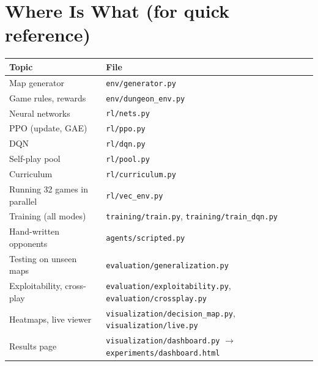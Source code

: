 \documentclass[11pt,a4paper]{article}
\newcommand{\code}[1]{\texttt{#1}}
\begin{document}
\section*{Where Is What (for quick reference)}
\begin{center}
\begin{tabular}{ll}
\toprule
\textbf{Topic} & \textbf{File}\\
\midrule
Map generator & \code{env/generator.py}\\
Game rules, rewards & \code{env/dungeon\_env.py}\\
Neural networks & \code{rl/nets.py}\\
PPO (update, GAE) & \code{rl/ppo.py}\\
DQN & \code{rl/dqn.py}\\
Self-play pool & \code{rl/pool.py}\\
Curriculum & \code{rl/curriculum.py}\\
Running 32 games in parallel & \code{rl/vec\_env.py}\\
Training (all modes) & \code{training/train.py}, \code{training/train\_dqn.py}\\
Hand-written opponents & \code{agents/scripted.py}\\
Testing on unseen maps & \code{evaluation/generalization.py}\\
Exploitability, cross-play & \code{evaluation/exploitability.py}, \code{evaluation/crossplay.py}\\
Heatmaps, live viewer & \code{visualization/decision\_map.py}, \code{visualization/live.py}\\
Results page & \code{visualization/dashboard.py} $\rightarrow$ \code{experiments/dashboard.html}\\
\bottomrule
\end{tabular}
\end{center}
\end{document}

